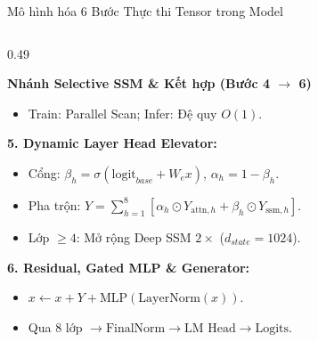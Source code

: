 \documentclass[aspectratio=169, 10pt]{beamer}
\begin{document}
\begin{frame}{Mô hình hóa 6 Bước Thực thi Tensor trong Model}
\begin{columns}[t]
\begin{column}{0.49\textwidth}
\begin{exampleblock}{\textbf{Nhánh Selective SSM \& Kết hợp (Bước 4 $\to$ 6)}}
\begin{itemize}
          \item Train: Parallel Scan; Infer: Đệ quy $O(1)$.
        \end{itemize}
        \textbf{5. Dynamic Layer Head Elevator:}
        \begin{itemize}
          \setlength{\itemsep}{0pt}
          \item Cổng: $\beta_h = \sigma(\text{logit}_{base} + W_e x)$, $\alpha_h = 1 - \beta_h$.
          \item Pha trộn: $Y = \sum_{h=1}^8 [\alpha_h \odot Y_{\text{attn}, h} + \beta_h \odot Y_{\text{ssm}, h}]$.
          \item Lớp $\ge 4$: Mở rộng Deep SSM $2\times$ ($d_{state}=1024$).
        \end{itemize}
        \textbf{6. Residual, Gated MLP \& Generator:}
        \begin{itemize}
          \setlength{\itemsep}{0pt}
          \item $x \leftarrow x + Y + \text{MLP}(\text{LayerNorm}(x))$.
          \item Qua 8 lớp $\to \text{FinalNorm} \to \text{LM Head} \to \text{Logits}$.
        \end{itemize}
      \end{exampleblock}
    \end{column}
  \end{columns}
\end{frame}
\end{document}

